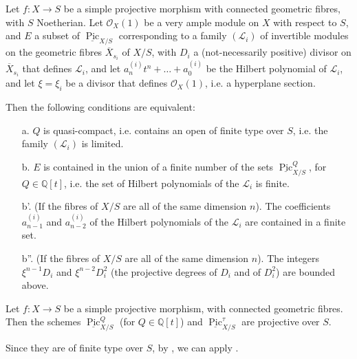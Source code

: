 \begin{theorem}\label{fga3.vi-4-theorem-4.1}
    Let $f\colon X\to S$ be a simple projective morphism with connected geometric fibres, with $S$ Noetherian.
    Let $\mathcal{O}_X(1)$ be a very ample module on $X$ with respect to $S$, and $E$ a subset of $\underline{\operatorname{Pic}}_{X/S}$ corresponding to a family $(\mathcal{L}_i)$ of invertible modules on the geometric fibres $\overline{X}_{s_i}$ of $X/S$, with $D_i$ a (not-necessarily positive) divisor on $\overline{X}_{s_i}$ that defines $\mathcal{L}_i$, and let $a_n^{(i)}t^n+\ldots+a_0^{(i)}$ be the Hilbert polynomial of $\mathcal{L}_i$, and let $\xi=\xi_i$ be a divisor that defines $\mathcal{O}_X(1)$, i.e. a hyperplane section.

    Then the following conditions are equivalent:

    \begin{enumerate}
        \item[a.] $Q$ is quasi-compact, i.e. contains an open of finite type over $S$, i.e. the family $(\mathcal{L}_i)$ is limited.
        \item[b.] $E$ is contained in the union of a finite number of the sets $\underline{\operatorname{Pic}}_{X/S}^Q$, for $Q\in\mathbb{Q}[t]$, i.e. the set of Hilbert polynomials of the $\mathcal{L}_i$ is finite.
        \item[b'.] (If the fibres of $X/S$ are all of the same dimension $n$).
              The coefficients $a_{n-1}^{(i)}$ and $a_{n-2}^{(i)}$ of the Hilbert polynomials of the $\mathcal{L}_i$ are contained in a finite set.
        \item[b''.] (If the fibres of $X/S$ are all of the same dimension $n$).
              The integers $\xi^{n-1}D_i$ and $\xi^{n-2}D_i^2$ (the projective degrees of $D_i$ and of $D_i^2$) are bounded above.
    \end{enumerate}
\end{theorem}

\begin{corollary}\label{fga3.vi-4-corollary-4.2}
    Let $f\colon X\to S$ be a simple projective morphism, with connected geometric fibres.
    Then the schemes $\underline{\operatorname{Pic}}_{X/S}^Q$ (for $Q\in\mathbb{Q}[t]$) and $\underline{\operatorname{Pic}}_{X/S}^\tau$ are projective over $S$.
\end{corollary}

\begin{cproof}
    Since they are of finite type over $S$, by , we can apply .
\end{cproof}

